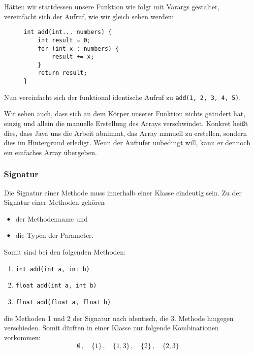 			Hätten wir stattdessen unsere Funktion wie folgt mit Varargs gestaltet, vereinfacht sich der Aufruf, wie wir gleich sehen werden:
			\begin{figure}[H]
				\centering
				\begin{lstlisting}
int add(int... numbers) {
	int result = 0;
	for (int x : numbers) {
		result += x;
	}
	return result;
}
				\end{lstlisting}
			\end{figure}
			Nun vereinfacht sich der funktional identische Aufruf zu \lstinline|add(1, 2, 3, 4, 5)|.
			
			Wir sehen auch, dass sich an dem Körper unserer Funktion nichts geändert hat, einzig und allein die manuelle Erstellung des Arrays verschwindet. Konkret heißt dies, dass Java uns die Arbeit abnimmt, das Array manuell zu erstellen, sondern dies im Hintergrund erledigt. Wenn der Aufrufer unbedingt will, kann er dennoch ein einfaches Array übergeben.
			

\subsubsection{Signatur}
	Die Signatur einer Methode muss innerhalb einer Klasse eindeutig sein. Zu der Signatur einer Methoden gehören
	\begin{itemize}
		\item der Methodenname und
		\item die Typen der Parameter.
	\end{itemize}

	Somit sind bei den folgenden Methoden:
	\begin{enumerate}
		\item \lstinline|int add(int a, int b)|
		\item \lstinline|float add(int a, int b)|
		\item \lstinline|float add(float a, float b)|
	\end{enumerate}
	die Methoden 1 und 2 der Signatur nach identisch, die 3. Methode hingegen verschieden. Somit dürften in einer Klasse nur folgende Kombinationen vorkommen:
	\begin{equation*}
		\emptyset \,,\quad \{ 1 \} \,,\quad \{ 1, 3 \} \,,\quad \{ 2 \} \,,\quad \{ 2, 3 \}
	\end{equation*}

